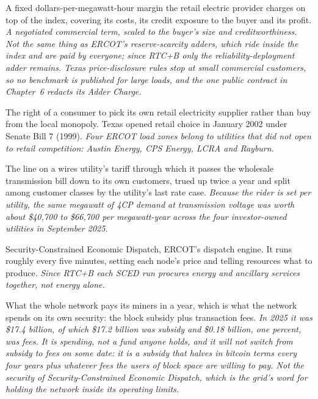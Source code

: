 \begin{description}[leftmargin=0pt,style=unboxed,itemsep=0.35em,parsep=0.15em]
\item[retail adder] \hypertarget{glossary:retail-adder}{}A fixed dollars-per-megawatt-hour margin the retail electric provider charges on top of the index, covering its costs, its credit exposure to the buyer and its profit. \emph{A negotiated commercial term, scaled to the buyer's size and creditworthiness. Not the same thing as ERCOT's reserve-scarcity adders, which ride inside the index and are paid by everyone; since RTC+B only the reliability-deployment adder remains. Texas price-disclosure rules stop at small commercial customers, so no benchmark is published for large loads, and the one public contract in Chapter~6 redacts its Adder Charge.}
\item[retail choice] \hypertarget{glossary:retail-choice}{}The right of a consumer to pick its own retail electricity supplier rather than buy from the local monopoly. Texas opened retail choice in January 2002 under Senate Bill 7 (1999). \emph{Four ERCOT load zones belong to utilities that did not open to retail competition: Austin Energy, CPS Energy, LCRA and Rayburn.}
\item[rider] \hypertarget{glossary:rider}{}The line on a wires utility's tariff through which it passes the wholesale transmission bill down to its own customers, trued up twice a year and split among customer classes by the utility's last rate case. \emph{Because the rider is set per utility, the same megawatt of 4CP demand at transmission voltage was worth about \$40,700 to \$66,700 per megawatt-year across the four investor-owned utilities in September 2025.}
\item[SCED] \hypertarget{glossary:sced}{}Security-Constrained Economic Dispatch, ERCOT's dispatch engine. It runs roughly every five minutes, setting each node's price and telling resources what to produce. \emph{Since RTC+B each SCED run procures energy and ancillary services together, not energy alone.}
\item[security budget] \hypertarget{glossary:security-budget}{}What the whole network pays its miners in a year, which is what the network spends on its own security: the block subsidy plus transaction fees. \emph{In 2025 it was \$17.4 billion, of which \$17.2 billion was subsidy and \$0.18 billion, one percent, was fees. It is spending, not a fund anyone holds, and it will not switch from subsidy to fees on some date: it is a subsidy that halves in bitcoin terms every four years plus whatever fees the users of block space are willing to pay. Not the security of Security-Constrained Economic Dispatch, which is the grid's word for holding the network inside its operating limits.}

\end{description}
